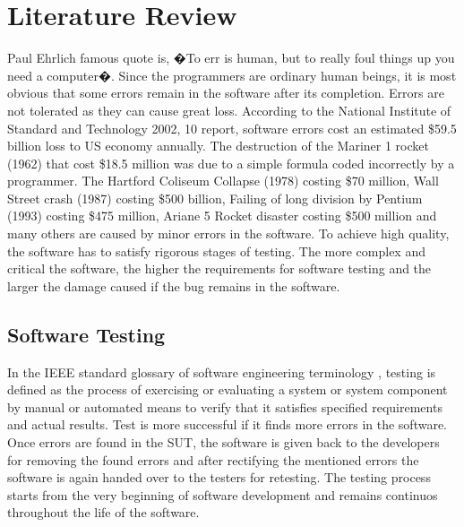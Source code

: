 \chapter{Literature Review}



Paul Ehrlich famous quote is, �To err is human, but to really foul things up you need a computer�. Since the programmers are ordinary human beings, it is most obvious that some errors remain in the software after its completion. Errors are not tolerated as they can cause great loss. According to the National Institute of Standard and Technology 2002, 10 report, software errors cost an estimated \$59.5 billion loss to US economy annually. The destruction of the Mariner 1 rocket (1962) that cost \$18.5 million was due to a simple formula coded incorrectly by a programmer. The Hartford Coliseum Collapse (1978) costing \$70 million, Wall Street crash (1987) costing \$500 billion, Failing of long division by Pentium (1993) costing \$475 million, Ariane 5 Rocket disaster costing \$500 million and many others are caused by minor errors in the software. To achieve high quality, the software has to satisfy rigorous stages of testing. The more complex and critical the software, the higher the requirements for software testing and the larger the damage caused if the bug remains in the software. 


\section{Software Testing}
In the IEEE standard glossary of software engineering terminology \cite{american1984}, testing is defined as the process of exercising or evaluating a system or system component by manual or automated means to verify that it satisfies specified requirements and actual results. Test is more successful if it finds more errors in the software. Once errors are found in the SUT, the software is given back to the developers for removing the found errors and after rectifying the mentioned errors the software is again handed over to the testers for retesting. The testing process starts from the very beginning of software development and remains continuos throughout the life of the software.

